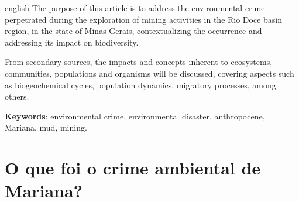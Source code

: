 \documentclass[
article,			%
11pt,				%
oneside,			%
a4paper,			%
english,			%
brazil,				%
sumario=tradicional
]{abntex2}
\begin{document}
	\renewcommand{\resumoname}{Abstract}
	\begin{resumoumacoluna}
		\begin{otherlanguage*}{english}
			The purpose of this article is to address the environmental crime perpetrated during the exploration of mining activities in the Rio Doce basin region, in the state of Minas Gerais, contextualizing the occurrence and addressing its impact on biodiversity.
			
			From secondary sources, the impacts and concepts inherent to ecosystems, communities, populations and organisms will be discussed, covering aspects such as biogeochemical cycles, population dynamics, migratory processes, among others.
			
			\vspace{\onelineskip}
			
			\noindent
			\textbf{Keywords}: environmental crime, environmental disaster, anthropocene, Mariana, mud, mining.
		\end{otherlanguage*}
	\end{resumoumacoluna}
	
	
	\textual
	\cleardoublepage	%
	
%	
%	
	
	
	\section{O que foi o crime ambiental de Mariana?}
	
\end{document}
